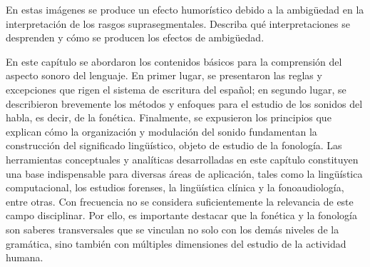 \begin{ejercicio}\label{ej:03-humor}
En estas imágenes se produce un efecto humorístico debido a la ambigüedad en la
interpretación de los rasgos suprasegmentales. Describa qué interpretaciones se
desprenden y cómo se producen los efectos de ambigüedad.

\end{ejercicio}

\begin{recuadro}
En este capítulo se abordaron los contenidos básicos para la comprensión del
aspecto sonoro del lenguaje. En primer lugar, se presentaron las reglas y
excepciones que rigen el sistema de escritura del español; en segundo lugar, se
describieron brevemente los métodos y enfoques para el estudio de los sonidos
del habla, es decir, de la fonética. Finalmente, se expusieron los principios
que explican cómo la organización y modulación del sonido fundamentan la
construcción del significado lingüístico, objeto de estudio de la fonología.
Las herramientas conceptuales y analíticas desarrolladas en este capítulo
constituyen una base indispensable para diversas áreas de aplicación, tales como
la lingüística computacional, los estudios forenses, la lingüística clínica y
la fonoaudiología, entre otras. Con frecuencia no se considera suficientemente
la relevancia de este campo disciplinar. Por ello, es importante destacar que la
fonética y la fonología son saberes transversales que se vinculan no solo con
los demás niveles de la gramática, sino también con múltiples dimensiones del
estudio de la actividad humana.
\end{recuadro}

\lecturasrecomendadas

\solucionario

